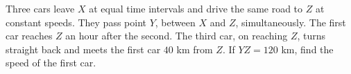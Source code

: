 Three cars leave $X$ at equal time intervals and drive the same road to $Z$ at constant speeds. They pass point $Y$, between $X$ and $Z$, simultaneously. The first car reaches $Z$ an hour after the second. The third car, on reaching $Z$, turns straight back and meets the first car $40$ km from $Z$. If $YZ=120$ km, find the speed of the first car.
